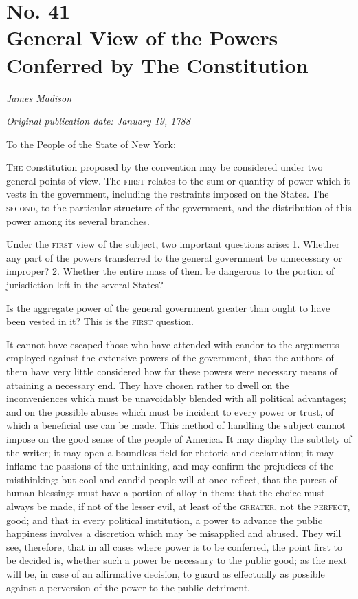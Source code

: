 \chapter[No. 41: General View of the Powers Conferred by The Constitution]{No. 41\\ {\small General View of the Powers Conferred by The Constitution}}

\textit{James Madison}

\textit{Original publication date: January 19, 1788}
\vspace{1cm}

To the People of the State of New York:
\vspace{.4cm}

\textsc{The c}onstitution proposed by the convention may be considered under two general points of view. 
The \textsc{first} relates to the sum or quantity of power which it vests in the government, including the restraints imposed on the States. 
The \textsc{second}, to the particular structure of the government, and the distribution of this power among its several branches.

Under the \textsc{first} view of the subject, two important questions arise: 1. 
Whether any part of the powers transferred to the general government be unnecessary or improper? 
2. 
Whether the entire mass of them be dangerous to the portion of jurisdiction left in the several States?

Is the aggregate power of the general government greater than ought to have been vested in it? 
This is the \textsc{first} question.

It cannot have escaped those who have attended with candor to the arguments employed against the extensive powers of the government, that the authors of them have very little considered how far these powers were necessary means of attaining a necessary end. 
They have chosen rather to dwell on the inconveniences which must be unavoidably blended with all political advantages; and on the possible abuses which must be incident to every power or trust, of which a beneficial use can be made. 
This method of handling the subject cannot impose on the good sense of the people of America. 
It may display the subtlety of the writer; it may open a boundless field for rhetoric and declamation; it may inflame the passions of the unthinking, and may confirm the prejudices of the misthinking: but cool and candid people will at once reflect, that the purest of human blessings must have a portion of alloy in them; that the choice must always be made, if not of the lesser evil, at least of the \textsc{greater}, not the \textsc{perfect}, good; and that in every political institution, a power to advance the public happiness involves a discretion which may be misapplied and abused. 
They will see, therefore, that in all cases where power is to be conferred, the point first to be decided is, whether such a power be necessary to the public good; as the next will be, in case of an affirmative decision, to guard as effectually as possible against a perversion of the power to the public detriment.

